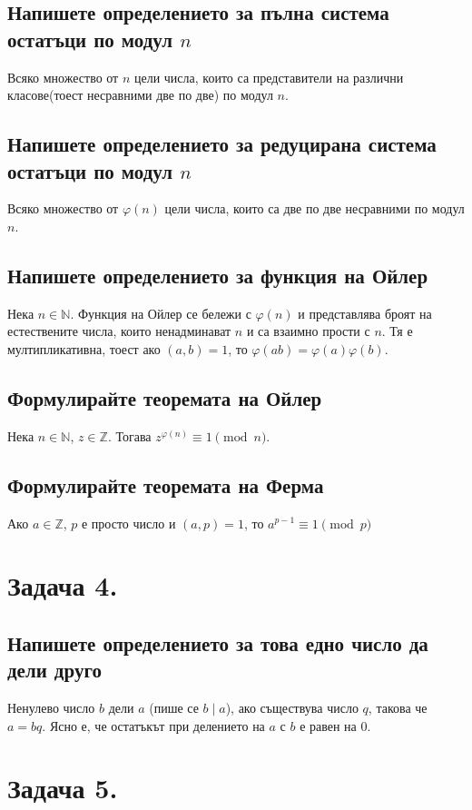 \documentclass[10pt]{article}
\newcommand*{\Z}{\mathbb{Z}}
\newcommand*{\N}{\mathbb{N}}
\begin{document}
\subsection*{Напишете определението за пълна система остатъци по модул $n$}
Всяко множество от $n$ цели числа, които са представители на различни класове(тоест несравними две по две) по модул $n$.

\subsection*{Напишете определението за редуцирана система остатъци по модул $n$}
Всяко множество от $\varphi(n)$ цели числа, които са две по две несравними по модул $n$.

\subsection*{Напишете определението за функция на Ойлер}
Нека $n \in \N$. Функция на Ойлер се бележи с $\varphi(n)$ и представлява броят на естествените числа, които ненадминават $n$ и са взаимно прости с $n$. Тя е мултипликативна, тоест ако $(a, b) = 1$, то $\varphi(ab) = \varphi(a)\varphi(b)$.

\subsection*{Формулирайте теоремата на Ойлер}
Нека $n \in \N$, $z \in \Z$. Тогава $z^{\varphi(n)} \equiv 1 \pmod{n}$.

\subsection*{Формулирайте теоремата на Ферма}
Ако $a \in \Z$, $p$ е просто число и $(a, p) = 1$, то $a^{p - 1} \equiv 1 \pmod{p}$

\section*{Задача 4.}

\subsection*{Напишете определението за това едно число да дели друго}
Ненулево число $b$ дели $a$ (пише се $b \mid a$), ако съществува число $q$, такова че $a = bq$. Ясно е, че остатъкът при делението на $a$ с $b$ е равен на 0.

\section*{Задача 5.}
\end{document}
